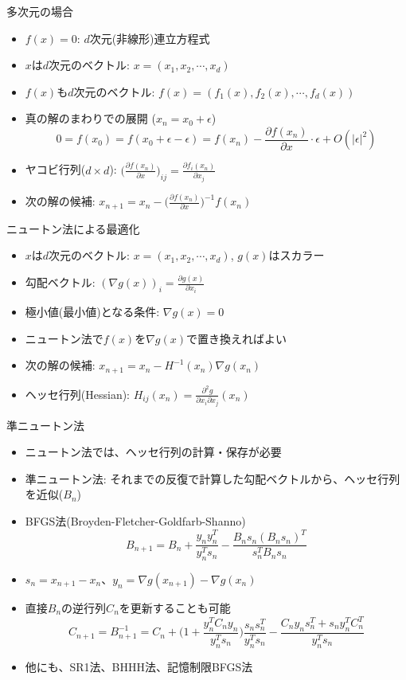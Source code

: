 \begin{frame}[t,fragile]{多次元の場合}
  \begin{itemize}
    \setlength{\itemsep}{1em}
  \item $f(x)=0$: $d$次元(非線形)連立方程式
  \item $x$は$d$次元のベクトル: $x = (x_1,x_2,\cdots,x_d)$
  \item $f(x)$も$d$次元のベクトル: $f(x) = (f_1(x), f_2(x),\cdots,f_d(x))$
  \item 真の解のまわりでの展開 ($x_n = x_0 + \epsilon$)
    \[
    0 = f(x_0) = f(x_0+\epsilon-\epsilon) = f(x_n) - \frac{\partial f(x_n)}{\partial x} \cdot \epsilon + O(|\epsilon|^2)
    \]
  \item ヤコビ行列($d\times d$): $\displaystyle \Big(\frac{\partial f(x_n)}{\partial x}\Big)_{ij} = \frac{\partial f_i(x_n)}{\partial x_j}$
  \item 次の解の候補: $\displaystyle x_{n+1} = x_n - \Big(\frac{\partial f(x_n)}{\partial x}\Big)^{-1} f(x_n)$
  \end{itemize}
\end{frame}

\begin{frame}[t,fragile]{ニュートン法による最適化}
  \begin{itemize}
    \setlength{\itemsep}{1em}
  \item $x$は$d$次元のベクトル: $x = (x_1,x_2,\cdots,x_d)$, $g(x)$はスカラー
  \item 勾配ベクトル: $\displaystyle (\nabla g(x))_i = \frac{\partial g(x)}{\partial x_i}$
  \item 極小値(最小値)となる条件: $\nabla g(x)=0$
  \item ニュートン法で$f(x)$を$\nabla g(x)$で置き換えればよい
  \item 次の解の候補: $\displaystyle x_{n+1} = x_n - H^{-1}(x_n) \nabla g(x_n)$
  \item ヘッセ行列(Hessian): $\displaystyle H_{ij}(x_n) = \frac{\partial^2 g}{\partial x_i \partial x_j}(x_n)$
  \end{itemize}
\end{frame}

\begin{frame}[t,fragile]{準ニュートン法}
  \begin{itemize}
  \item ニュートン法では、ヘッセ行列の計算・保存が必要
  \item 準ニュートン法: それまでの反復で計算した勾配ベクトルから、ヘッセ行列を近似($B_n$)
  \item BFGS法(Broyden-Fletcher-Goldfarb-Shanno)
    \[
    B_{n+1} = B_{n} + \frac{y_n y_n^T}{y_n^T s_n} - \frac{B_{n} s_n (B_{n} s_n)^T}{s_n^T B_n s_n}
    \]
  \item $s_n = x_{n+1} - x_n$、$y_n = \nabla g(x_{n+1}) - \nabla g(x_n)$
  \item 直接$B_{n}$の逆行列$C_{n}$を更新することも可能
    \[
    C_{n+1} = B_{n+1}^{-1} = C_n + \Big( 1 + \frac{y_n^T C_n y_n}{y_n^T s_n} \Big)
    \frac{s_n s_n^T}{y_n^T s_n} - \frac{C_n y_n s_n^T + s_n y_n^T C_n^T}{y_n^T s_n} \]
  \item 他にも、SR1法、BHHH法、記憶制限BFGS法
  \end{itemize}
\end{frame}

